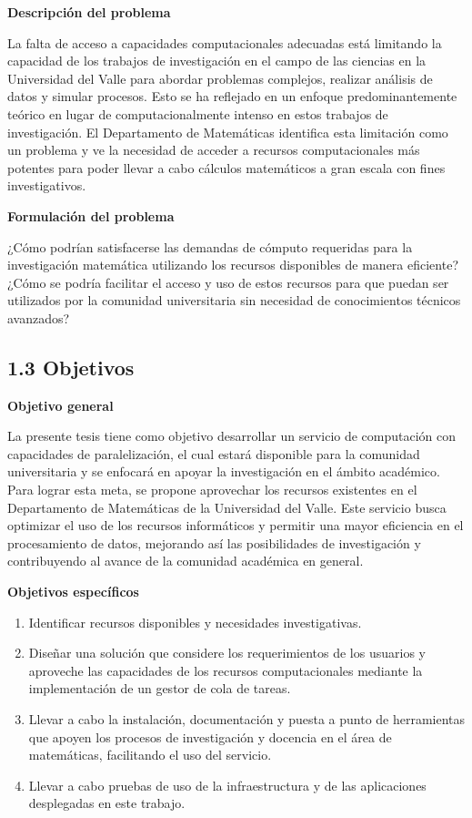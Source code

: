 \begin{spacing}{1.5}
  \textbf{Descripción del problema}

  La falta de acceso a capacidades computacionales adecuadas está limitando la capacidad de los trabajos de investigación en el campo de las ciencias en la Universidad del Valle para abordar problemas complejos, realizar análisis de datos y simular procesos. Esto se ha reflejado en un enfoque predominantemente teórico en lugar de computacionalmente intenso en estos trabajos de investigación. El Departamento de Matemáticas identifica esta limitación como un problema y ve la necesidad de acceder a recursos computacionales más potentes para poder llevar a cabo cálculos matemáticos a gran escala con fines investigativos.

  \textbf{Formulación del problema}

  ¿Cómo podrían satisfacerse las demandas de cómputo requeridas para la investigación matemática utilizando los recursos disponibles de manera eficiente? ¿Cómo se podría facilitar el acceso y uso de estos recursos para que puedan ser utilizados por la comunidad universitaria sin necesidad de conocimientos técnicos avanzados?

  \subsection{1.3 Objetivos}

  \textbf{Objetivo general}

  La presente tesis tiene como objetivo desarrollar un servicio de computación con capacidades de paralelización, el cual estará disponible para la comunidad universitaria y se enfocará en apoyar la investigación en el ámbito académico. Para lograr esta meta, se propone aprovechar los recursos existentes en el Departamento de Matemáticas de la Universidad del Valle. Este servicio busca optimizar el uso de los recursos informáticos y permitir una mayor eficiencia en el procesamiento de datos, mejorando así las posibilidades de investigación y contribuyendo al avance de la comunidad académica en general.

  \textbf{Objetivos específicos}
  \begin{enumerate}
    \item Identificar recursos disponibles y necesidades investigativas.
    \item Diseñar una solución que considere los requerimientos de los usuarios y aproveche las capacidades de los recursos computacionales mediante la implementación de un gestor de cola de tareas.
    \item Llevar a cabo la instalación, documentación y puesta a punto de herramientas que apoyen los procesos de investigación y docencia en el área de matemáticas, facilitando el uso del servicio.
    \item  Llevar a cabo pruebas de uso de la infraestructura y de las aplicaciones desplegadas en este trabajo.\newline
  \end{enumerate}


\end{spacing}
